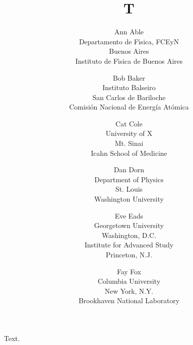\documentclass{article}
\title{T}
\author{Ann Able \\
Departamento de F\'{\i}sica, FCEyN \\
Buenos Aires \\
Instituto de F\'{\i}sica de Buenos Aires
\and Bob Baker \\
Instituto Balseiro \\
San Carlos de Bariloche \\
Comisi\'on Nacional de Energ\'ia At\'omica
\and Cat Cole \\
University of X \\
Mt. Sinai \\
Icahn School of Medicine
\and Dan Dorn \\
Department of Physics \\
St. Louis \\
Washington University
\and Eve Eads \\
Georgetown University \\
Washington, D.C. \\
Institute for Advanced Study \\
Princeton, N.J.
\and Fay Fox \\
Columbia University \\
New York, N.Y. \\
Brookhaven National Laboratory}
\begin{document}
\maketitle
Text.
\end{document}
